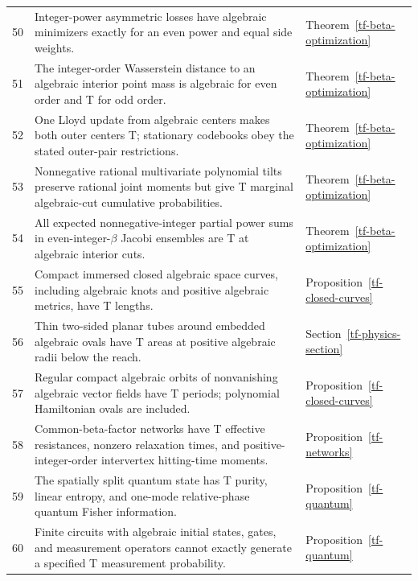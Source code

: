 \documentclass[11pt,a4paper]{article}
\theoremstyle{definition}
\theoremstyle{remark}
\numberwithin{equation}{section}
\begin{document}
\begin{longtable}{@{}L{.055\textwidth}L{.68\textwidth}L{.205\textwidth}@{}}
50 & Integer-power asymmetric losses have algebraic minimizers exactly for an even power and equal side weights. & Theorem~\ref{tf-beta-optimization}\\
51 & The integer-order Wasserstein distance to an algebraic interior point mass is algebraic for even order and T for odd order. & Theorem~\ref{tf-beta-optimization}\\
52 & One Lloyd update from algebraic centers makes both outer centers T; stationary codebooks obey the stated outer-pair restrictions. & Theorem~\ref{tf-beta-optimization}\\
53 & Nonnegative rational multivariate polynomial tilts preserve rational joint moments but give T marginal algebraic-cut cumulative probabilities. & Theorem~\ref{tf-beta-optimization}\\
54 & All expected nonnegative-integer partial power sums in even-integer-$\beta$ Jacobi ensembles are T at algebraic interior cuts. & Theorem~\ref{tf-beta-optimization}\\
55 & Compact immersed closed algebraic space curves, including algebraic knots and positive algebraic metrics, have T lengths. & Proposition~\ref{tf-closed-curves}\\
56 & Thin two-sided planar tubes around embedded algebraic ovals have T areas at positive algebraic radii below the reach. & Section~\ref{tf-physics-section}\\
57 & Regular compact algebraic orbits of nonvanishing algebraic vector fields have T periods; polynomial Hamiltonian ovals are included. & Proposition~\ref{tf-closed-curves}\\
58 & Common-beta-factor networks have T effective resistances, nonzero relaxation times, and positive-integer-order intervertex hitting-time moments. & Proposition~\ref{tf-networks}\\
59 & The spatially split quantum state has T purity, linear entropy, and one-mode relative-phase quantum Fisher information. & Proposition~\ref{tf-quantum}\\
60 & Finite circuits with algebraic initial states, gates, and measurement operators cannot exactly generate a specified T measurement probability. & Proposition~\ref{tf-quantum}\\
\end{longtable}
\endgroup
\end{document}
